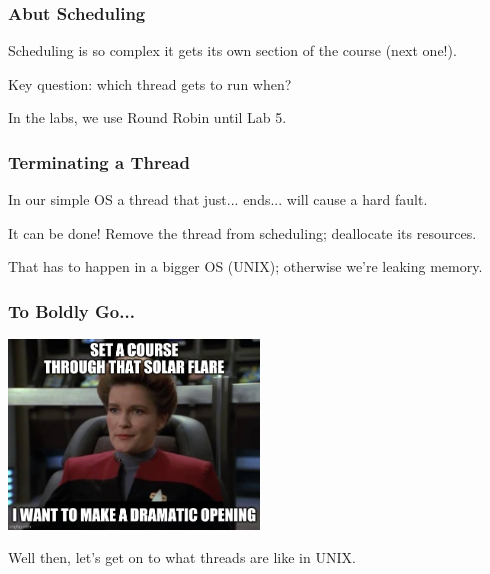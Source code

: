 \begin{frame}
\frametitle{Abut Scheduling}

Scheduling is so complex it gets its own section of the course (next one!).

Key question: which thread gets to run when?

In the labs, we use Round Robin until Lab 5.

\end{frame}


\begin{frame}
\frametitle{Terminating a Thread}

In our simple OS a thread that just... ends... will cause a hard fault.

It can be done! Remove the thread from scheduling; deallocate its resources.

That has to happen in a bigger OS (UNIX); otherwise we're leaking memory.


\end{frame}


\begin{frame}
\frametitle{To Boldly Go...}

\begin{center}
	\includegraphics[width=0.5\textwidth]{images/setcourse.jpg}
\end{center}

Well then, let's get on to what threads are like in UNIX.

\end{frame}





